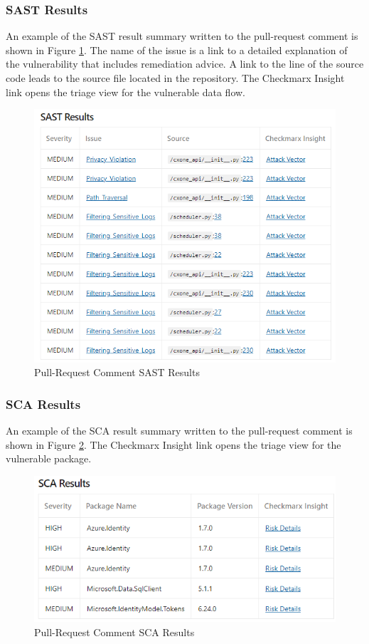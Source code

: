 \subsubsection{SAST Results}

An example of the SAST result summary written to the pull-request comment
is shown in Figure
\ref{fig:pr-sast-section}.  The name of the issue is a link to a detailed
explanation of the vulnerability that includes remediation advice.  A
link to the line of the source code leads to the source file located in the
repository.  The Checkmarx Insight link opens the triage view for the vulnerable
data flow.

\begin{figure}[ht]
    \includegraphics[width=\textwidth]{graphics/pr-sast.png}
    \caption{Pull-Request Comment SAST Results}
    \label{fig:pr-sast-section}
\end{figure}

\subsubsection{SCA Results}

An example of the SCA result summary written to the pull-request comment
is shown in Figure
\ref{fig:pr-sca-section}.  The Checkmarx Insight link opens the triage view 
for the vulnerable package. 

\begin{figure}[ht]
    \includegraphics[width=\textwidth]{graphics/pr-sca.png}
    \caption{Pull-Request Comment SCA Results}
    \label{fig:pr-sca-section}
\end{figure}

